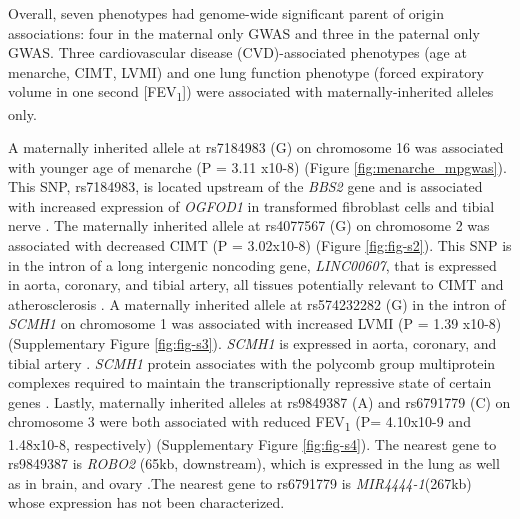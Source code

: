 Overall, seven phenotypes had genome-wide significant parent of origin associations: four in the maternal only GWAS and three in the paternal only GWAS. Three cardiovascular disease (CVD)-associated phenotypes (age at menarche, CIMT, LVMI) and one lung function phenotype (forced expiratory volume in one second [FEV\textsubscript{1}]) were associated with maternally-inherited alleles only. 

A maternally inherited allele at rs7184983 (G) on chromosome 16 was associated with younger age of menarche (P = 3.11 x10-8) (Figure \ref{fig:menarche_mpgwas}). This SNP, rs7184983, is located upstream of the \emph{BBS2} gene and is associated with increased expression of \emph{OGFOD1} in transformed fibroblast cells and tibial nerve \cite{Consortium2015}. The maternally inherited allele at rs4077567 (G) on chromosome 2 was associated with decreased CIMT (P = 3.02x10-8) (Figure \ref{fig:fig-s2}). This SNP is in the intron of a long intergenic noncoding gene, \emph{LINC00607}, that  is expressed in aorta, coronary, and tibial artery, all tissues potentially relevant to CIMT and atherosclerosis \cite{Consortium2015}. A maternally inherited allele at rs574232282 (G) in the intron of \emph{SCMH1} on chromosome 1 was associated with increased LVMI (P = 1.39 x10-8) (Supplementary Figure \ref{fig:fig-s3}). \emph{SCMH1} is expressed in aorta, coronary, and tibial artery \cite{Consortium2015}. \emph{SCMH1} protein associates with the polycomb group multiprotein complexes required to maintain the transcriptionally repressive state of certain genes \cite{Consortium2015}. Lastly, maternally inherited alleles at rs9849387 (A) and rs6791779 (C) on chromosome 3 were both associated with reduced FEV\textsubscript{1} (P= 4.10x10-9 and 1.48x10-8, respectively) (Supplementary Figure \ref{fig:fig-s4}). The nearest gene to rs9849387 is \emph{ROBO2} (65kb, downstream), which is expressed in the lung as well as in brain, and ovary \cite{Consortium2015}.The nearest gene to rs6791779 is \emph{MIR4444-1}(267kb) whose expression has not been characterized.

